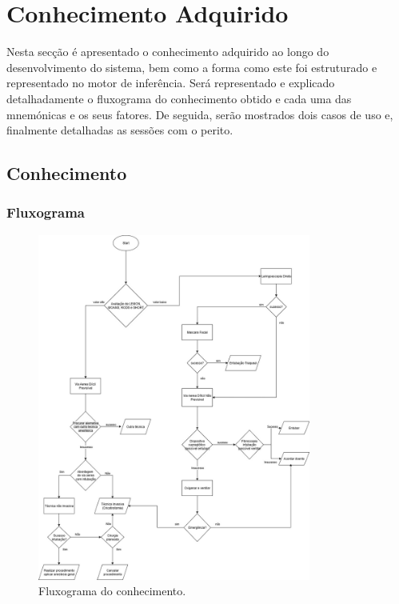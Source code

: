 \documentclass[a4paper,12pt,twoside]{article}
\begin{document}
    \newpage


    \section{Conhecimento Adquirido}
    Nesta secção é apresentado o conhecimento adquirido ao longo do desenvolvimento do sistema, bem como a forma como este foi estruturado e representado no motor de inferência. Será representado e explicado detalhadamente o fluxograma do conhecimento obtido e cada uma das mnemónicas e os seus fatores. De seguida, serão mostrados dois casos de uso e, finalmente detalhadas as sessões com o perito.
    \subsection{Conhecimento}
    \subsubsection{Fluxograma}
    \begin{figure}[H]
        \centering
        \includegraphics[width=0.8\textwidth]{./resources/pdf/Conhecimento.jpg}
        \caption{Fluxograma do conhecimento.}
        \label{fig:fluxograma}
    \end{figure}
\end{document}
